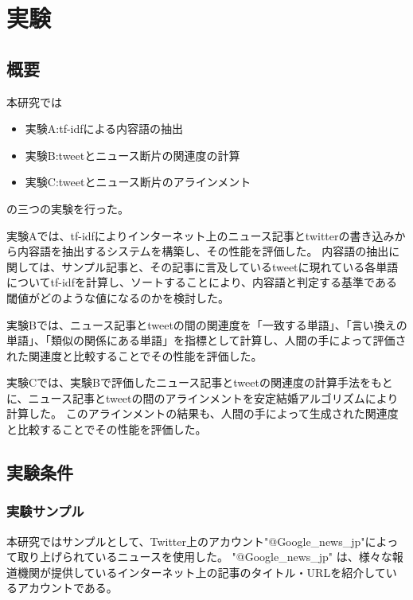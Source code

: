 \documentclass[12pt]{jarticle}
\begin{document}

\section{実験}
\def\googlenews{Google\_news\_jp}
\subsection{概要}

本研究では
\begin{itemize}
\item 実験A:tf-idfによる内容語の抽出
\item 実験B:tweetとニュース断片の関連度の計算
\item 実験C:tweetとニュース断片のアラインメント
\end{itemize}
の三つの実験を行った。

実験Aでは、tf-idfによりインターネット上のニュース記事とtwitterの書き込みから内容語を抽出するシステムを構築し、その性能を評価した。
内容語の抽出に関しては、サンプル記事と、その記事に言及しているtweetに現れている各単語についてtf-idfを計算し、ソートすることにより、内容語と判定する基準である閾値がどのような値になるのかを検討した。

実験Bでは、ニュース記事とtweetの間の関連度を「一致する単語」、「言い換えの単語」、「類似の関係にある単語」を指標として計算し、人間の手によって評価された関連度と比較することでその性能を評価した。

実験Cでは、実験Bで評価したニュース記事とtweetの関連度の計算手法をもとに、ニュース記事とtweetの間のアラインメントを安定結婚アルゴリズムにより計算した。
このアラインメントの結果も、人間の手によって生成された関連度と比較することでその性能を評価した。

\subsection{実験条件}
\subsubsection{実験サンプル}
本研究ではサンプルとして、Twitter上のアカウント"@\googlenews "によって取り上げられているニュースを使用した。
"@\googlenews" は、様々な報道機関が提供しているインターネット上の記事のタイトル・URLを紹介しているアカウントである。
\end{document}
